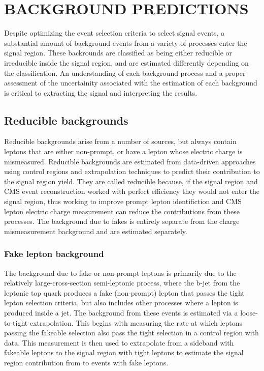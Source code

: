 %
%

\chapter{BACKGROUND PREDICTIONS}
Despite optimizing the event selection criteria to select signal events, a substantial amount of background events from a variety of processes enter the signal region.
These backrounds are classified as being either reducible or irreducible inside the signal region, and are estimated differently depending on the classification. An understanding
of each background process and a proper assessment of the uncertainity associated with the estimation of each background is critical to extracting the signal and interpreting
the results. 

\section{Reducible backgrounds}
Reducible backgrounds arise from a number of sources, but always contain leptons that are either non-prompt, or have a lepton whose electric charge is mismeasured.
Reducible backgrounds are estimated from data-driven approaches using control regions and extrapolation techniques to predict their contribution to the signal region yield. 
They are called reducible because, if the signal region and CMS event reconstruction worked with perfect efficiency they would not enter the signal region, thus working
to improve prompt lepton identifiction and CMS lepton electric charge measurement can reduce the contributions from these processes. The background due to fakes is entirely
separate from the charge mismeasurement background and are estimated separately. 

\subsection{Fake lepton background}    
The background due to fake or non-prompt leptons is primarily due to the relatively large-cross-section semi-leptonic \ttbar process, where the b-jet from the leptonic top quark
produces a fake (non-prompt) lepton that passes the tight lepton selection criteria, but also includes other processes where a lepton is produced inside a jet. The background from
these events is estimated via a loose-to-tight extrapolation. This begins with measuring the rate at which leptons passing the fakeable selection also pass the tight selection in a
control region with data. This measurement is then used to extrapolate from a sideband with fakeable leptons to the signal region with
tight leptons to estimate the signal region contribution from to events with fake leptons. 

